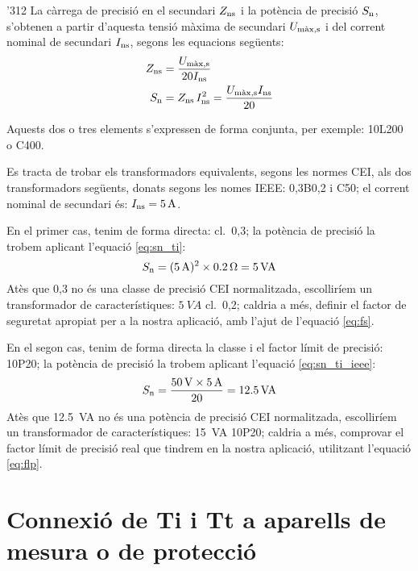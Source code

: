 \begin{dingautolist}{'312}
    La càrrega de precisió en el secundari
    $Z_\mathrm{ns}$ i la potència de precisió $S_\mathrm{n}$, s'obtenen a partir d'aquesta
    tensió màxima de secundari $U_\mathrm{m\grave{a}x,s}$
    i del corrent     nominal de secundari $I_\mathrm{ns}$, segons les equacions següents:
    \begin{align}
        Z_\mathrm{ns} &= \frac{U_\mathrm{m\grave{a}x,s}}{20 I_\mathrm{ns}}\\
        S_\mathrm{n} &= Z_\mathrm{ns} \,I_\mathrm{ns}^2 = \frac{U_\mathrm{m\grave{a}x,s} I_\mathrm{ns}}{20}
        \label{eq:sn_ti_ieee}
    \end{align}
\end{dingautolist}

Aquests dos o tres elements s'expressen de forma conjunta, per exemple:
10L200 o C400.


\begin{exemple}
    Es tracta de trobar els transformadors equivalents, segons les normes CEI, als dos
    transformadors següents, donats segons les nomes IEEE: 0,3B0,2 i
    C50; el corrent nominal de secundari és:    $I_\mathrm{ns}=\SI{5}{A}$.

    En el primer cas, tenim de forma directa: cl.~0,3; la potència de precisió la trobem
    aplicant l'equació \eqref{eq:sn_ti}:
    \[
        S_\mathrm{n} =(\SI{5}{A})^2 \times \SI{0,2}{\ohm} =  \SI{5}{VA}
    \]
    Atès que 0,3 no és una classe de precisió CEI normalitzada,
    escolliríem un transformador de característiques: $\SI{5}{VA}$ cl.~0,2; caldria a més, definir el factor de
    seguretat apropiat per a la nostra aplicació, amb l'ajut de l'equació \eqref{eq:fs}.

    En el segon cas, tenim de forma directa la classe i el factor límit de
    precisió: 10P20; la potència de precisió la trobem
    aplicant l'equació \eqref{eq:sn_ti_ieee}:
    \[
        S_\mathrm{n} = \frac{\SI{50}{V} \times\SI{5}{A}}{20} = \SI{12,5}{VA}
    \]
    Atès que \SI{12,5}{VA} no és una potència de precisió CEI normalitzada,
     escolliríem un transformador de característiques:
    \SI{15}{VA} 10P20; caldria a més, comprovar el factor límit de precisió real
    que tindrem en la nostra aplicació, utilitzant l'equació \eqref{eq:flp}.
\end{exemple}

\section{Connexió de Ti i Tt a aparells de mesura o de
protecció}\label{sec:conex_ti_tt}


